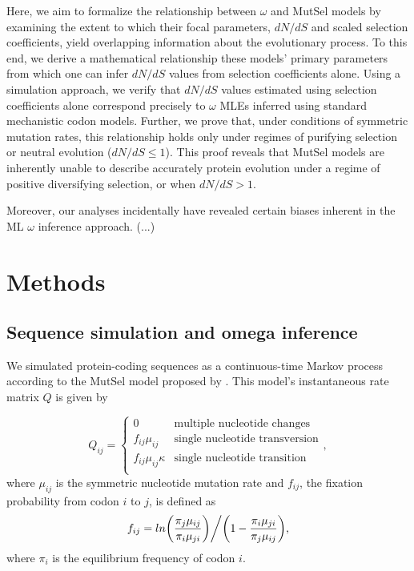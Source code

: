 \documentclass[11pt]{article}
\begin{document}
Here, we aim to formalize the relationship between $\omega$ and MutSel models by examining the extent to which their focal parameters, $dN/dS$ and scaled selection coefficients, yield overlapping information about the evolutionary process. To this end, we derive a mathematical relationship these models' primary parameters from which one can infer $dN/dS$ values from selection coefficients alone. Using a simulation approach, we verify that $dN/dS$ values estimated using selection coefficients alone correspond precisely to $\omega$ MLEs inferred using standard mechanistic codon models. Further, we prove that, under conditions of symmetric mutation rates, this relationship holds only under regimes of purifying selection or neutral evolution ($dN/dS \leq 1$). This proof reveals that MutSel models are inherently unable to describe accurately protein evolution under a regime of positive diversifying selection, or when $dN/dS > 1$.

Moreover, our analyses incidentally have revealed certain biases inherent in the ML $\omega$ inference approach. (...)
 


\section*{Methods}

\subsection*{Sequence simulation and omega inference}
We simulated protein-coding sequences as a continuous-time Markov
process \cite{Yang2006} according to the MutSel model proposed by \cite{HalpernBruno1998}. This model's instantaneous rate matrix $Q$ is given by 

\begin{equation}
Q_{ij} = \left\{ \begin{array}{rl}
              0                                           &\mbox{multiple nucleotide changes} \\
              f_{ij}\mu_{ij}                          &\mbox{single nucleotide transversion} \\
              f_{ij}\mu_{ij}\kappa               &\mbox{single nucleotide transition} \\
         \end{array} \right.,
\end{equation} where $\mu_{ij}$ is the symmetric nucleotide mutation rate and $f_{ij}$, the fixation probability from codon $i$ to $j$, is defined as \begin{equation}f_{ij} = ln\bigg{(}\frac{\pi_j\mu_{ij}}{\pi_i\mu_{ji}}\bigg{)}\bigg{/}\bigg{(}1 - \frac{\pi_i\mu_{ji}}{\pi_j\mu_{ij}}\bigg{)},\end{equation} where $\pi_i$ is the equilibrium frequency of codon $i$.
\end{document}
